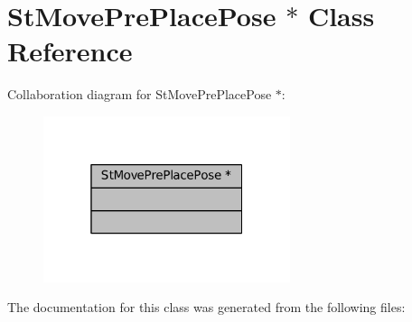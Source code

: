 \hypertarget{classStMovePrePlacePose_01_5}{}\section{St\+Move\+Pre\+Place\+Pose $\ast$ Class Reference}
\label{classStMovePrePlacePose_01_5}


Collaboration diagram for St\+Move\+Pre\+Place\+Pose $\ast$\+:
\nopagebreak
\begin{figure}[H]
\begin{center}
\leavevmode
\includegraphics[width=205pt]{classStMovePrePlacePose_01_5__coll__graph}
\end{center}
\end{figure}


The documentation for this class was generated from the following files\+:
